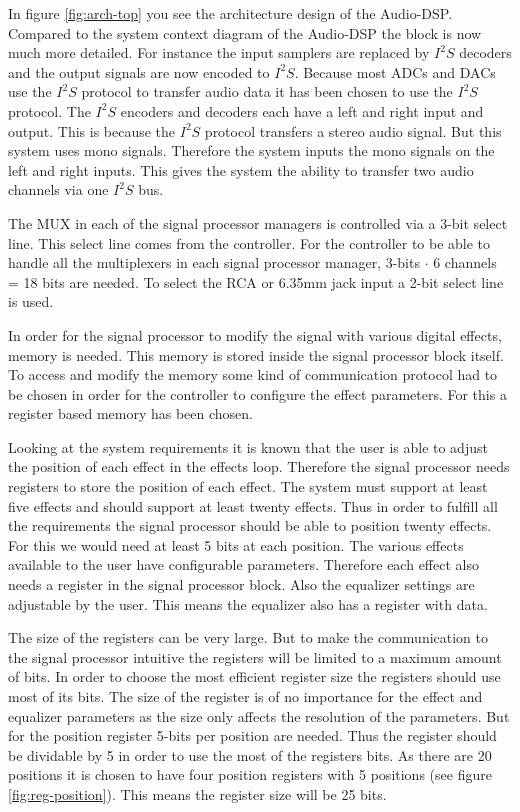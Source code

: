 In figure \ref{fig:arch-top} you see the architecture design of the Audio-DSP. Compared to the system context diagram of the Audio-DSP the block is now much more detailed. For instance the input samplers are replaced by $I^2S$ decoders and the output signals are now encoded to $I^2S$. Because most ADCs and DACs use the $I^2S$ protocol to transfer audio data it has been chosen to use the $I^2S$ protocol. The $I^2S$ encoders and decoders each have a left and right input and output. This is because the $I^2S$ protocol transfers a stereo audio signal. But this system uses mono signals. Therefore the system inputs the mono signals on the left and right inputs. This gives the system the ability to transfer two audio channels via one $I^2S$ bus.

The MUX in each of the signal processor managers is controlled via a 3-bit select line. This select line comes from the controller. For the controller to be able to handle all the multiplexers in each signal processor manager, 3-bits $\cdot$ 6 channels = 18 bits are needed. To select the RCA or 6.35mm jack input a 2-bit select line is used.

In order for the signal processor to modify the signal with various digital effects, memory is needed. This memory is stored inside the signal processor block itself. To access and modify the memory some kind of communication protocol had to be chosen in order for the controller to configure the effect parameters. For this a register based memory has been chosen.

Looking at the system requirements it is known that the user is able to adjust the position of each effect in the effects loop. Therefore the signal processor needs registers to store the position of each effect. The system must support at least five effects and should support at least twenty effects. Thus in order to fulfill all the requirements the signal processor should be able to position twenty effects. For this we would need at least 5 bits at each position. The various effects available to the user have configurable parameters. Therefore each effect also needs a register in the signal processor block. Also the equalizer settings are adjustable by the user. This means the equalizer also has a register with data.

The size of the registers can be very large. But to make the communication to the signal processor intuitive the registers will be limited to a maximum amount of bits. In order to choose the most efficient register size the registers should use most of its bits. The size of the register is of no importance for the effect and equalizer parameters as the size only affects the resolution of the parameters. But for the position register 5-bits per position are needed. Thus the register should be dividable by 5 in order to use the most of the registers bits. As there are 20 positions it is chosen to have four position registers with 5 positions (see figure \ref{fig:reg-position}).
This means the register size will be 25 bits.

